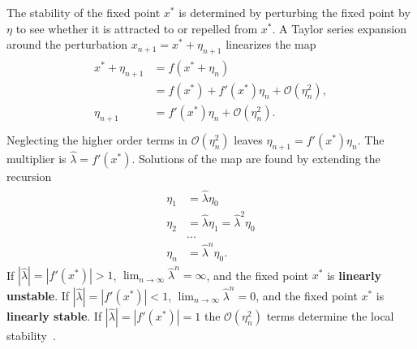 The stability of the fixed point $x^*$ is
determined by perturbing the fixed point by $\eta$ to see whether it is
attracted to or repelled from $x^*$. A Taylor series expansion around
the perturbation $x_{n+1} = x^* + \eta_{n+1}$ linearizes the map
\begin{align*}
\begin{split}
x^* + \eta_{n+1} &= f(x^* + \eta_n)\\
&= f(x^*) + f'(x^*)\eta_n + \mathcal{O}(\eta_n^2),\\
\eta_{n+1} &= f'(x^*)\eta_n + \mathcal{O}(\eta_n^2).\\
\end{split}
\end{align*}
Neglecting the higher order terms in $\mathcal{O}(\eta_n^2)$ leaves
$\eta_{n+1} = f'(x^*)\eta_n$. The multiplier is $\hat{\lambda} =
f'(x^*)$. Solutions of the map are found by extending the recursion
\begin{align*}
\begin{split}
\eta_{1} &= \hat{\lambda}\eta_0\\
\eta_{2} &= \hat{\lambda}\eta_1 = \hat{\lambda}^2\eta_0\\
&...\\
\eta_{n} &=\hat{\lambda}^n\eta_0.
\end{split}
\end{align*}
If $|\hat{\lambda}| = |f'(x^*)| > 1$, $\lim_{n \to \infty}\hat{\lambda}^n = \infty$, and
the fixed point $x^*$ is \textbf{linearly unstable}. If $|\hat{\lambda}| = |f'(x^*)| < 1$, $\lim_{n \to
  \infty}\hat{\lambda}^n = 0$, and the fixed point $x^*$ is
\textbf{linearly stable}. If
$|\hat{\lambda}| = |f'(x^*)| = 1$ the $\mathcal{O}(\eta_n^2)$ terms
determine the local stability~\cite{strogatz}. 

